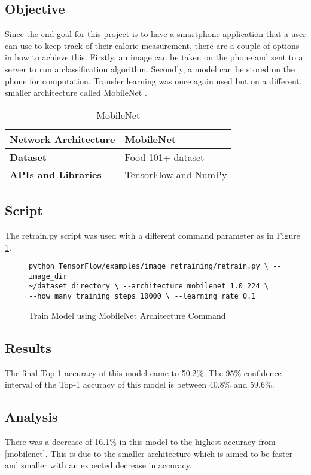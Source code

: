 \tocless\subsection{Objective}
Since the end goal for this project is to have a smartphone
application that a user can use to keep track of their calorie measurement,
there are a couple of options in how to achieve this. Firstly, an image can be
taken on the phone and sent to a server to run a classification algorithm.
Secondly, a model can be stored on the phone for computation. Transfer learning was once again used but on a different, smaller architecture called MobileNet \parencite{mobilenet}.

\begin{table}[h]
\centering
\caption{MobileNet}
\label{my-label}
\begin{tabular}{|l|p{8cm}|}
\hline
\textbf{Network Architecture} & MobileNet           \\ \hline
\textbf{Dataset}              & Food-101+ dataset \\ \hline
\textbf{APIs and Libraries}   & TensorFlow and NumPy                                                       \\ \hline
\end{tabular}
\end{table}

\tocless\subsection{Script}
The retrain.py script \parencite{retrainInception} was used with a different
command parameter as in Figure \ref{lst:mobilenetCommand}.

\begin{figure}[h]
\caption{Train Model using MobileNet Architecture Command}
\label{lst:mobilenetCommand}
\begin{lstlisting}[style=Command]
python TensorFlow/examples/image_retraining/retrain.py \ --image_dir
~/dataset_directory \ --architecture mobilenet_1.0_224 \
--how_many_training_steps 10000 \ --learning_rate 0.1
\end{lstlisting}
\end{figure}

\tocless\subsection{Results}
The final Top-1 accuracy of this model came to 50.2\%.
The 95\% confidence interval of the Top-1 accuracy of this model is between 40.8\% and 59.6\%.

\tocless\subsection{Analysis}
There was a decrease of 16.1\% in this model to the highest accuracy from
\ref{mobilenet}. This is due to the smaller architecture which is aimed to be faster
and smaller with an expected decrease in accuracy.
